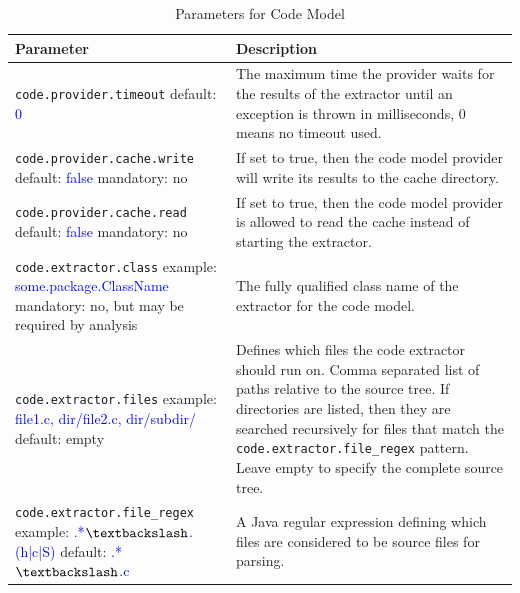 \begin{table}[t] %
    \caption{Parameters for Code Model} \label{tab:propfile}
    \begin{tabularx}{\textwidth}{|p{}|p{}|}\hline
    
        \textbf{Parameter} & \textbf{Description} \\ \hline \hline

        \texttt{code.provider.timeout} \newline default: \textcolor{blue}{0} & The maximum time the provider waits for the results of the extractor until an exception is thrown in milliseconds, 0 means no timeout used. \\ \hline    
        
        \texttt{code.provider.cache.write} \newline default: \textcolor{blue}{false} \newline mandatory: no & If set to true, then the code model provider will write its results to the cache directory.\\ \hline
         
        \texttt{code.provider.cache.read} \newline default: \textcolor{blue}{false}  \newline mandatory: no &  If set to true, then the code model provider is allowed to read the cache instead of starting the extractor. \\ \hline

        \texttt{code.extractor.class} \newline example: \textcolor{blue}{some.package.ClassName} \newline mandatory: no, but may be required by analysis & The fully qualified class name of the extractor for the code model. \\ \hline

        \texttt{code.extractor.files} \newline example: \textcolor{blue}{file1.c, dir/file2.c, dir/subdir/} \newline default: empty & Defines which files the code extractor should run on. Comma separated list of paths relative to the source tree. If directories are listed, then they are searched recursively for files that match the \texttt{code.extractor.file\_regex} pattern. Leave empty to specify the complete source tree. \\ \hline
        
        \texttt{code.extractor.file\_regex} \newline example: \textcolor{blue}{.*$\textbackslash$.(h|c|S)} \newline default: \textcolor{blue}{.*$\textbackslash$.c} & A Java regular expression defining which files are considered to be source files for parsing. \\ \hline
        

\end{tabularx}
\end{table}
